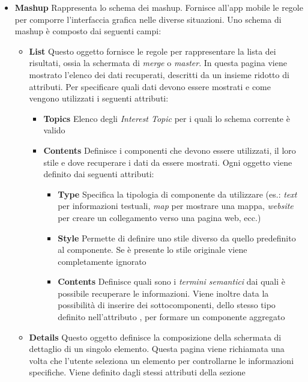 \begin{itemize}
\begin{itemize}
	\end{itemize}
	\item \textbf{Mashup} Rappresenta lo schema dei mashup. Fornisce all'app mobile le regole per comporre l'interfaccia grafica nelle diverse situazioni. Uno schema di mashup è composto dai seguenti campi:
	\begin{itemize}
		\item \textbf{List} Questo oggetto fornisce le regole per rappresentare la lista dei risultati, ossia la schermata di \emph{merge} o \emph{master}. In questa pagina viene mostrato l'elenco dei dati recuperati, descritti da un insieme ridotto di attributi. Per specificare quali dati devono essere mostrati e come vengono utilizzati i seguenti attributi:
		\begin{itemize}
			\item \textbf{Topics} Elenco degli \emph{Interest Topic} per i quali lo schema corrente è valido
			\item \textbf{Contents} Definisce i componenti che devono essere utilizzati, il loro stile e dove recuperare i dati da essere mostrati. Ogni oggetto viene definito dai seguenti attributi:
			\begin{itemize}
				\item \textbf{Type} Specifica la tipologia di componente da utilizzare (es.: \emph{text} per informazioni testuali, \emph{map} per mostrare una mappa, \emph{website} per creare un collegamento verso una pagina web, ecc.)
				\item \textbf{Style} Permette di definire uno stile diverso da quello predefinito al componente. Se è presente lo stile originale viene completamente ignorato
				\item \textbf{Contents} Definisce quali sono i \emph{termini semantici} dai quali è possibile recuperare le informazioni. Viene inoltre data la possibilità di inserire dei sottocomponenti, dello stesso tipo definito nell'attributo , per formare un componente aggregato
			\end{itemize}
		\end{itemize}	
		\item \textbf{Details} Questo oggetto definisce la composizione della schermata di dettaglio di un singolo elemento. Questa pagina viene richiamata una volta che l'utente seleziona un elemento per controllarne le informazioni specifiche. Viene definito dagli stessi attributi della sezione 			
	\end{itemize}
\end{itemize}

